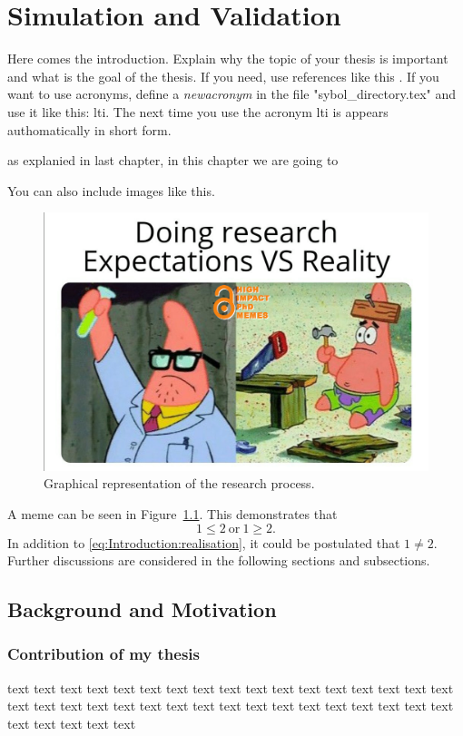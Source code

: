\chapter{Simulation and Validation} \label{ch:Simulaiton and Validation}

Here comes the introduction. Explain why the topic of your thesis is important and what is the goal of the thesis. If you need, use references like this \cite{higham2020handbook}. If you want to use acronyms, define a \textit{newacronym} in the file "sybol\_directory.tex" and use it like this: \gls{lti}. The next time you use the acronym \gls{lti} is appears authomatically in short form. 

as explanied in last chapter, in this chapter we are going to 

You can also include images like this.


\begin{figure}[ht!]
    \centering
    \includegraphics[width=\textwidth]{03_images/meme.png}
    \caption{Graphical representation of the research process.}
    \label{fig:Introduction:meme}
\end{figure}


A meme can be seen in Figure~\ref*{fig:Introduction:meme}. This demonstrates that 
\begin{equation} \label{eq:Introduction:realisation}
	1 \le 2 \ \text{or} \ 1 \ge 2.
\end{equation}
In addition to \eqref{eq:Introduction:realisation}, it could be postulated that $1 \ne 2$. Further discussions are considered in the following sections and subsections.

\section{Background and Motivation} \label{sec:Introduction:Background}

\subsection{Contribution of my thesis}

text text text text text text text text text text text text text text text text text text text text text text text text text text text text text text text text text text text text text text text 